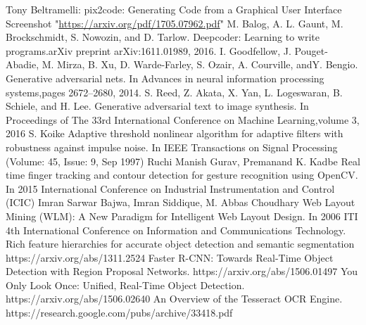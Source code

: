 \begin{thebibliography}{20}

   Tony Beltramelli: pix2code: Generating Code from a Graphical User Interface Screenshot "\url {https://arxiv.org/pdf/1705.07962.pdf}"
   M. Balog, A. L. Gaunt, M. Brockschmidt, S. Nowozin, and D. Tarlow. Deepcoder: Learning to write programs.arXiv preprint arXiv:1611.01989, 2016.
   I. Goodfellow, J. Pouget-Abadie, M. Mirza, B. Xu, D. Warde-Farley, S. Ozair, A. Courville, andY. Bengio. Generative adversarial nets. In Advances in neural information processing systems,pages 2672–2680, 2014.
   S. Reed, Z. Akata, X. Yan, L. Logeswaran, B. Schiele, and H. Lee. Generative adversarial text to image synthesis. In Proceedings of The 33rd International Conference on Machine Learning,volume 3, 2016
   S. Koike Adaptive threshold nonlinear algorithm for adaptive filters with robustness against impulse noise. In IEEE Transactions on Signal Processing (Volume: 45, Issue: 9, Sep 1997)
   Ruchi Manish Gurav, Premanand K. Kadbe  Real time finger tracking and contour detection for gesture recognition using OpenCV. In  2015 International Conference on Industrial Instrumentation and Control (ICIC)
   Imran Sarwar Bajwa, Imran Siddique, M. Abbas Choudhary Web Layout Mining (WLM): A New Paradigm for Intelligent Web Layout Design. In 2006 ITI 4th International Conference on Information and Communications Technology.
   Rich feature hierarchies for accurate object detection and semantic segmentation https://arxiv.org/abs/1311.2524
   Faster R-CNN: Towards Real-Time Object Detection with Region Proposal Networks. https://arxiv.org/abs/1506.01497
   You Only Look Once: Unified, Real-Time Object Detection. https://arxiv.org/abs/1506.02640
   An Overview of the Tesseract OCR Engine. https://research.google.com/pubs/archive/33418.pdf

\end{thebibliography}
